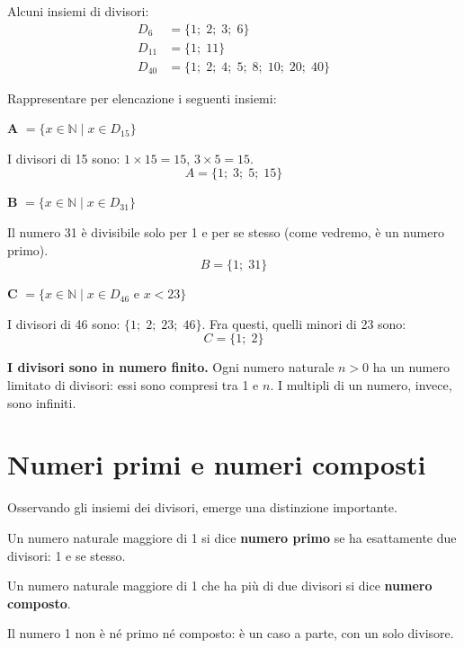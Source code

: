 \begin{esempio}
    Alcuni insiemi di divisori:
    \begin{align*}
        D_6    & = \{1;\; 2;\; 3;\; 6\}                        \\
        D_{11} & = \{1;\; 11\}                                 \\
        D_{40} & = \{1;\; 2;\; 4;\; 5;\; 8;\; 10;\; 20;\; 40\}
    \end{align*}
\end{esempio}

\begin{esempio}
    Rappresentare per elencazione i seguenti insiemi:

    \medskip
    \textbf{A} $= \{x \in \mathbb{N} \mid x \in D_{15}\}$

    I divisori di 15 sono: $1 \times 15 = 15$, $3 \times 5 = 15$.
    \[
        A = \{1;\; 3;\; 5;\; 15\}
    \]

    \medskip
    \textbf{B} $= \{x \in \mathbb{N} \mid x \in D_{31}\}$

    Il numero 31 è divisibile solo per 1 e per se stesso (come vedremo, è un numero primo).
    \[
        B = \{1;\; 31\}
    \]

    \medskip
    \textbf{C} $= \{x \in \mathbb{N} \mid x \in D_{46} \text{ e } x < 23\}$

    I divisori di 46 sono: $\{1;\; 2;\; 23;\; 46\}$. Fra questi, quelli minori di 23 sono:
    \[
        C = \{1;\; 2\}
    \]
\end{esempio}

\begin{attenzione}
    \textbf{I divisori sono in numero finito.} Ogni numero naturale $n > 0$ ha un
    numero limitato di divisori: essi sono compresi tra 1 e $n$.
    I multipli di un numero, invece, sono infiniti.
\end{attenzione}

\section{Numeri primi e numeri composti}

Osservando gli insiemi dei divisori, emerge una distinzione importante.

\begin{definizione}
    Un numero naturale maggiore di 1 si dice \textbf{numero primo} se ha esattamente
    due divisori: 1 e se stesso.

    Un numero naturale maggiore di 1 che ha più di due divisori si dice
    \textbf{numero composto}.

    Il numero 1 non è né primo né composto: è un caso a parte, con un solo divisore.
\end{definizione}

